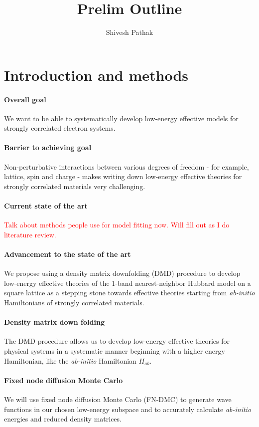 \documentclass{article}
\title{Prelim Outline}
\author{Shivesh Pathak}
\begin{document}
\section{Introduction and methods}
\paragraph{Overall goal} We want to be able to systematically develop low-energy effective models for strongly correlated electron systems.

\paragraph{Barrier to achieving goal} Non-perturbative interactions between various degrees of freedom - for example, lattice, spin and charge - makes writing down low-energy effective theories for strongly correlated materials very challenging.

\paragraph{Current state of the art} \textcolor{red}{Talk about methods people use for model fitting now. Will fill out as I do literature review.}

\paragraph{Advancement to the state of the art} We propose using a density matrix downfolding (DMD) procedure to develop low-energy effective theories of the 1-band nearest-neighbor Hubbard model on a square lattice as a stepping stone towards effective theories starting from \textit{ab-initio} Hamiltonians of strongly correlated materials.

\paragraph{Density matrix down folding} 
The DMD procedure allows us to develop low-energy effective theories for physical systems in a systematic manner beginning with a higher energy Hamiltonian, like the \textit{ab-initio} Hamiltonian $H_{ab}$.

\paragraph{Fixed node diffusion Monte Carlo}
We will use fixed node diffusion Monte Carlo (FN-DMC) to generate wave functions in our chosen low-energy subspace and to accurately calculate \textit{ab-initio} energies and reduced density matrices.
\end{document}
